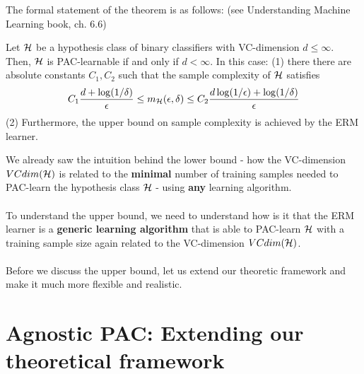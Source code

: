 The formal statement of the theorem is as follows: (see   Understanding Machine Learning book, ch. 6.6)
	

  \begin{theorem} 
    Let $\mathcal{H}$ be a hypothesis class of
    binary classifiers with VC-dimension $d\leq \infty$. 
    Then, $\mathcal{H}$ is PAC-learnable if and only if $d<\infty$. In this case: (1) there
    there are absolute constants $C_1,C_2$
    such that the sample complexity of $\mathcal{H}$ satisfies \[ C_1
    \frac{d + \log(1/\delta)}{\epsilon} \le m_{\mathcal{H}}(\epsilon,\delta) \le
    C_2 \frac{d \log(1/\epsilon) + \log(1/\delta)}{\epsilon} \]
(2) Furthermore, the upper bound on sample complexity is achieved by the ERM learner.
  \end{theorem}

  We already saw the intuition behind the lower bound - how the VC-dimension
  $VCdim(\mathcal{H})$ is related to the {\bf minimal} number of training samples needed
  to PAC-learn the hypothesis class $\mathcal{H}$ - using {\bf any} learning algorithm.
\\~\\
To understand the upper bound, we need to understand 
how is it that the ERM learner is a {\bf generic
learning algorithm} that is able to PAC-learn $\mathcal{H}$ with a training sample size
again related to the VC-dimension $VCdim(\mathcal{H})$.
\\~\\
Before we discuss the upper bound, let us extend our theoretic framework and
make it much more flexible and realistic.



  \section{Agnostic PAC: Extending our theoretical framework}

